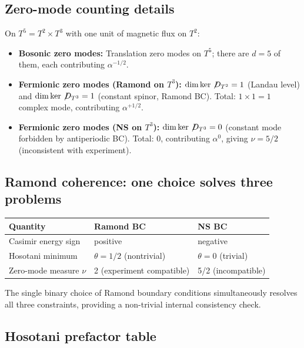 \documentclass[11pt,a4paper]{article}
\begin{document}
\subsection{Zero-mode counting details}

On $T^5=T^2\times T^3$ with one unit of magnetic flux on $T^2$:
\begin{itemize}[leftmargin=1.5em]
\item \textbf{Bosonic zero modes:}  Translation zero modes on $T^5$; there are
  $d=5$ of them, each contributing $\alpha^{-1/2}$.
\item \textbf{Fermionic zero modes (Ramond on $T^3$):}
  $\dim\ker\not\!D_{T^2}=1$ (Landau level) and
  $\dim\ker\not\!D_{T^3}=1$ (constant spinor, Ramond BC).
  Total: $1\times1=1$ complex mode, contributing $\alpha^{+1/2}$.
\item \textbf{Fermionic zero modes (NS on $T^3$):}
  $\dim\ker\not\!D_{T^3}=0$ (constant mode forbidden by antiperiodic BC).
  Total: 0, contributing $\alpha^0$, giving $\nu=5/2$ (inconsistent with experiment).
\end{itemize}

\subsection{Ramond coherence: one choice solves three problems}

\begin{center}
\renewcommand{\arraystretch}{1.2}
\begin{tabular}{lll}
\toprule
Quantity & Ramond BC & NS BC\\
\midrule
Casimir energy sign & positive & negative\\
Hosotani minimum & $\theta=1/2$ (nontrivial) & $\theta=0$ (trivial)\\
Zero-mode measure $\nu$ & 2 (experiment compatible) & 5/2 (incompatible)\\
\bottomrule
\end{tabular}
\end{center}

The single binary choice of Ramond boundary conditions simultaneously resolves all
three constraints, providing a non-trivial internal consistency check.

\subsection{Hosotani prefactor table}
\end{document}
